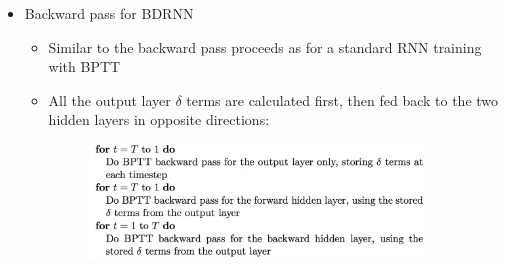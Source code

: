 \documentclass{beamer}
\begin{document}
{
    \begin{itemize}
        \item Backward pass for BDRNN 
            \begin{itemize} 
                \item Similar to the backward pass proceeds as for a standard RNN training with BPTT  
                \item All the output layer $ \delta $ terms are calculated first, 
                    then fed back to the two hidden layers in opposite directions:
	            \begin{figure}[ht]  
	            	\begin{center}
	            		\includegraphics[width=3.5in]{Images/BDRNN_backward_pass.png}   
	            	\end{center}   
	            \end{figure}
            \end{itemize}
    \end{itemize}
}
\end{document}
